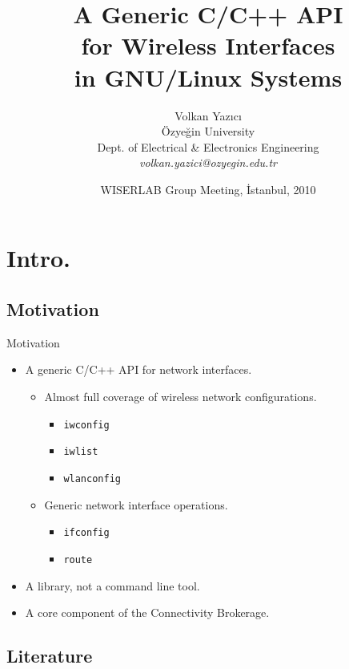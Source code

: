 \documentclass[turkish,12pt,red,compress,mathserif]{beamer}
\title{A Generic C/C++ API \\
  for Wireless Interfaces \\
  in GNU/Linux Systems}
\author{Volkan Yazıcı \\
  Özyeğin University \\
  Dept. of Electrical \& Electronics Engineering \\
  \emph{volkan.yazici@ozyegin.edu.tr}}
\date[Fall 2010]{WISERLAB Group Meeting, İstanbul, 2010}
\begin{document}
\begin{frame}\titlepage\end{frame}
\begin{frame}\tableofcontents\end{frame}


\section{Intro.}


\subsection{Motivation}

\begin{frame}{Motivation}
  \begin{itemize}
  \item A generic C/C++ API for network interfaces.
    \begin{itemize}
    \item Almost full coverage of wireless network configurations.
      \begin{itemize}
      \item \texttt{iwconfig}
      \item \texttt{iwlist}
      \item \texttt{wlanconfig}
      \end{itemize}
    \item Generic network interface operations.
      \begin{itemize}
      \item \texttt{ifconfig}
      \item \texttt{route}
      \end{itemize}
    \end{itemize}
  \item A \alert{library}, not a command line tool.
  \item A core component of the \alert{Connectivity Brokerage}.
  \end{itemize}
\end{frame}


\subsection{Literature}
\end{document}
